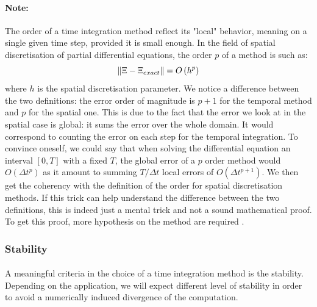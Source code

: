         \paragraph{Note:}
        The order of a time integration method reflect its "local" behavior, meaning on a single given time step, provided it is small enough.
        In the field of spatial discretisation of partial differential equations, the order $p$ of a method is such as:
        \begin{equation}
          \norm{\Xi - \Xi_{exact}} = O\left(h^p\right)
        \end{equation}
        where $h$ is the spatial discretisation parameter.
        We notice a difference between the two definitions: the error order of magnitude is $p+1$ for the temporal method and $p$ for the spatial one.
        This is due to the fact that the error we look at in the spatial case is global: it sums the error over the whole domain.
        It would correspond to counting the error on each step for the temporal integration.
        To convince oneself, we could say that when solving the differential equation  an interval $\left[0, T\right]$ with a fixed $T$, the global error of a $p$ order method would  $O\left(\Delta t^p\right)$ as it amount to summing $T/\Delta t$ local errors of $O\left(\Delta t^{p+1}\right)$.
        We then get the coherency with the definition of the order for spatial discretisation methods.
        If this trick can help understand the difference between the two definitions, this is indeed just a mental trick and not a sound mathematical proof.
        To get this proof, more hypothesis on the method are required \cite{Iserles2008}.


      \subsubsection{Stability}

        \paragraph{}
        A meaningful criteria in the choice of a time integration method is the stability.
        Depending on the application, we will expect different level of stability in order to avoid a numerically induced divergence of the computation.

